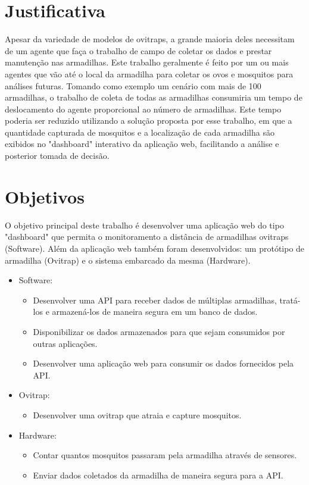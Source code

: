 \documentclass[
	12pt,				%
	openright,			%
	oneside,			%
	a4paper,			%
	chapter=TITLE,		%
	english,			%
	brazil				%
	]{abntex2}
\begin{document}
\section{Justificativa}
Apesar da variedade de modelos de ovitraps, a grande maioria deles necessitam de um agente que faça o trabalho de
campo de coletar os dados e prestar manutenção nas armadilhas. Este trabalho geralmente é feito por um ou mais agentes que vão até o local
da armadilha para coletar os ovos e mosquitos para análises futuras. Tomando como
exemplo um cenário com mais de 100 armadilhas, o trabalho de coleta de todas as
armadilhas consumiria um tempo de deslocamento do agente proporcional ao número de
armadilhas. Este tempo poderia ser reduzido utilizando a solução proposta por esse trabalho, em que a quantidade capturada de mosquitos e a 
localização de cada armadilha são exibidos no "dashboard" interativo da aplicação web, facilitando a análise e posterior tomada de decisão.

\section{Objetivos}

O objetivo principal deste trabalho é desenvolver uma aplicação web do tipo "dashboard" que permita o monitoramento a distância de armadilhas ovitraps (Software).
Além da aplicação web também foram desenvolvidos: um protótipo de armadilha (Ovitrap) e o sistema embarcado da mesma (Hardware).

\begin{itemize}
    \item Software:
        \begin{itemize}
        \item Desenvolver uma API para receber dados de múltiplas armadilhas, tratá-los e armazená-los de maneira segura em um 
        banco de dados.
        \item Disponibilizar os dados armazenados para que sejam consumidos por outras aplicações.
        \item Desenvolver uma aplicação web para consumir os dados fornecidos pela API.
        \end{itemize}
    \item Ovitrap:
        \begin{itemize}
        \item Desenvolver uma ovitrap que atraia e capture mosquitos.
        \end{itemize}
    \item Hardware:
        \begin{itemize}
        \item Contar quantos mosquitos passaram pela armadilha através de sensores.
        \item Enviar dados coletados da armadilha de maneira segura para a API.
        \end{itemize}
\end{itemize}
\end{document}
